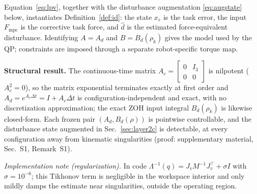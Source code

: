\documentclass[journal]{IEEEtran}
\newcommand{\Fmpc}{F_{\text{mpc}}}
\begin{document}
Equation~\eqref{eq:lpv}, together with the disturbance augmentation
\eqref{eq:augstate} below, instantiates Definition~\ref{def:id}: the state
$x_e$ is the task error, the input $\Fmpc$ is the corrective task force, and
$\hat d$ is the estimated force-equivalent disturbance. Identifying $A=A_d$
and $B=B_d(\rho_k)$ gives the model used by the QP; constraints are imposed
through a separate robot-specific torque map.

\textbf{Structural result.}
The continuous-time matrix $A_c=\begin{bmatrix}0&I_3\\0&0\end{bmatrix}$
is nilpotent ($A_c^2=0$), so the matrix exponential terminates exactly at
first order and $A_d=e^{A_c\Delta t}=I+A_c\Delta t$ is
configuration-independent and exact, with no discretization
approximation; the exact ZOH input integral $B_d(\rho_k)$ is likewise
closed-form. Each frozen pair $(A_d,B_d(\rho))$ is pointwise controllable,
and the disturbance state augmented in Sec.~\ref{sec:layer2c} is
detectable, at every configuration away from kinematic singularities
(proof: supplementary material, Sec.~S1, Remark~S1).

\textit{Implementation note (regularization).}
In code $\Lambda^{-1}(q)=J_vM^{-1}J_v^\top+\sigma I$ with $\sigma=10^{-6}$; this
Tikhonov term is negligible in the workspace interior and only mildly damps the
estimate near singularities, outside the operating region.
\end{document}
